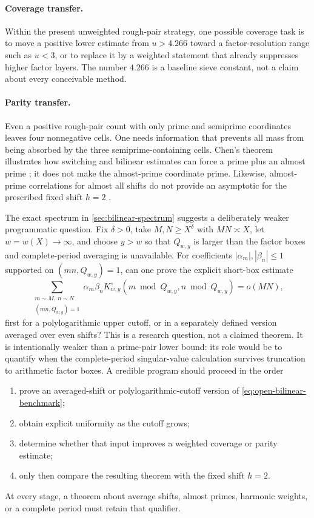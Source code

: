 \documentclass[11pt]{article}
\theoremstyle{definition}
\theoremstyle{remark}
\begin{document}
\paragraph{Coverage transfer.}
Within the present unweighted rough-pair strategy, one possible coverage task is to move a positive lower estimate from $u>4.266$ toward a factor-resolution range such as $u<3$, or to replace it by a weighted statement that already suppresses higher factor layers.  The number $4.266$ is a baseline sieve constant, not a claim about every conceivable method.

\paragraph{Parity transfer.}
Even a positive rough-pair count with only prime and semiprime coordinates leaves four nonnegative cells.  One needs information that prevents all mass from being absorbed by the three semiprime-containing cells.  Chen's theorem illustrates how switching and bilinear estimates can force a prime plus an almost prime \citep{Chen1973,FriedlanderIwaniec2010}; it does not make the almost-prime coordinate prime.  Likewise, almost-prime correlations for almost all shifts do not provide an asymptotic for the prescribed fixed shift $h=2$ \citep{Evans2023}.

The exact spectrum in \cref{sec:bilinear-spectrum} suggests a deliberately weaker programmatic question.  Fix $\delta>0$, take $M,N\ge X^\delta$ with $MN\asymp X$, let $w=w(X)\to\infty$, and choose $y>w$ so that $Q_{w,y}$ is larger than the factor boxes and complete-period averaging is unavailable.  For coefficients $|\alpha_m|,|\beta_n|\le1$ supported on $(mn,Q_{w,y})=1$, can one prove the explicit short-box estimate
\begin{equation}\label{eq:open-bilinear-benchmark}
 \sum_{\substack{m\sim M,\ n\sim N\\(mn,Q_{w,y})=1}}
 \alpha_m\beta_n
 K_{w,y}^{\circ}(m\bmod Q_{w,y},n\bmod Q_{w,y})
 =o(MN),
\end{equation}
first for a polylogarithmic upper cutoff, or in a separately defined version averaged over even shifts?  This is a research question, not a claimed theorem.  It is intentionally weaker than a prime-pair lower bound: its role would be to quantify when the complete-period singular-value calculation survives truncation to arithmetic factor boxes.  A credible program should proceed in the order
\begin{enumerate}[label=(\roman*),leftmargin=2.5em]
 \item prove an averaged-shift or polylogarithmic-cutoff version of \eqref{eq:open-bilinear-benchmark};
 \item obtain explicit uniformity as the cutoff grows;
 \item determine whether that input improves a weighted coverage or parity estimate;
 \item only then compare the resulting theorem with the fixed shift $h=2$.
\end{enumerate}
At every stage, a theorem about average shifts, almost primes, harmonic weights, or a complete period must retain that qualifier.
\end{document}
